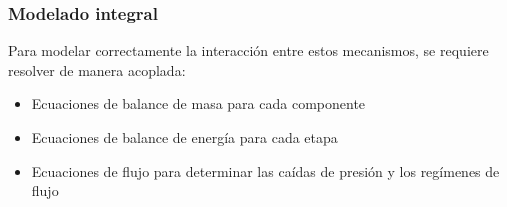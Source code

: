 \subsubsection{Modelado integral}
Para modelar correctamente la interacción entre estos mecanismos, se requiere resolver de manera acoplada:
\begin{itemize}
    \item Ecuaciones de balance de masa para cada componente
    \item Ecuaciones de balance de energía para cada etapa
    \item Ecuaciones de flujo para determinar las caídas de presión y los regímenes de flujo
\end{itemize}